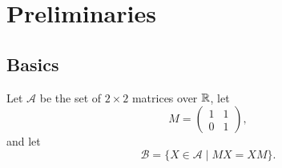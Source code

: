 \chapter{Preliminaries}

\section{Basics}

Let $\mathcal{A}$ be the set of $2\times2$ matrices over $\mathbb{R}$, let
\begin{equation*}
  M = \begin{pmatrix}
    1 & 1 \\
    0 & 1
  \end{pmatrix},
\end{equation*}
and let
\begin{equation*}
  \mathcal{B} = \{X\in\mathcal{A}\mid MX = XM\}.
\end{equation*}

